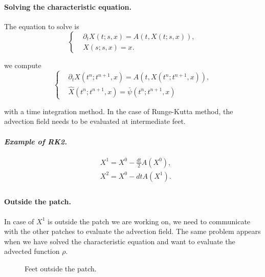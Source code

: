 \documentclass[presentation.tex]{subfiles}
\begin{document}
\paragraph{Solving the characteristic equation. }
The equation to solve is 
\begin{equation}
\left\{
\begin{aligned}
	& \partial_t X(t; s, x)  = A(t,X(t; s, x)), \\
	& X(s; s, x) = x.
\end{aligned}
\right.
\end{equation}


we compute 
\begin{equation}
\left\{
\begin{aligned}
	& \partial_t X(t^{n}; t^{n+1}, x)  = A(t, X(t^{n}; t^{n+1}, x)), \\
	& \hat{X}(t^{n}; t^{n+1}, x) = \bar{\psi} (t^{n}; t^{n+1}, x)
\end{aligned}
\right.
\end{equation}

with a time integration method. In the case of Runge-Kutta method, the advection field needs to be evaluated at intermediate feet.

\paragraph{\textit{Example of RK2.}}
\begin{equation}
\begin{aligned}
	& X^1 = X^0 - \frac{dt}{2} A(X^0), \\
	& X^2 = X^0 - dt A(X^1). \\
\end{aligned}
\end{equation}


\paragraph{Outside the patch.}
In case of $X^1$ is outside the patch we are working on, we need to communicate with the other patches to evaluate the advection field. 
The same problem appears when we have solved the characteristic equation and want to evaluate the advected function $\rho$. 


\begin{figure}[!h]
\centering
{}
\caption{Feet outside the patch.}
\end{figure}
\end{document}
